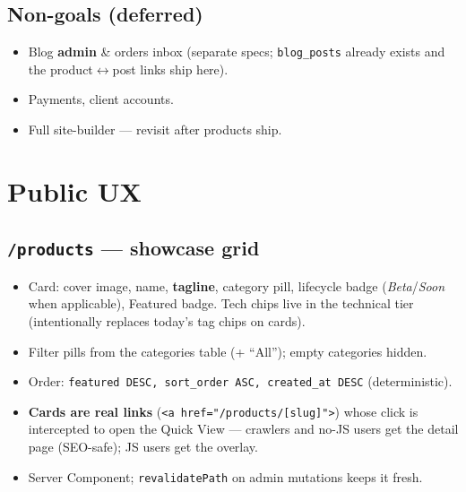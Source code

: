 \documentclass[11pt,a4paper]{article}
\begin{document}
\subsection{Non-goals (deferred)}
\begin{itemize}
  \item Blog \textbf{admin} \& orders inbox (separate specs; \texttt{blog\_posts} already
        exists and the product$\leftrightarrow$post links ship here).
  \item Payments, client accounts.
  \item Full site-builder --- revisit after products ship.
\end{itemize}

\section{Public UX}
\subsection{\texttt{/products} --- showcase grid}
\begin{itemize}
  \item Card: cover image, name, \textbf{tagline}, category pill, lifecycle badge
        (\emph{Beta}/\emph{Soon} when applicable), Featured badge. Tech chips live in the
        technical tier (intentionally replaces today's tag chips on cards).
  \item Filter pills from the categories table (+ ``All''); empty categories hidden.
  \item Order: \texttt{featured DESC, sort\_order ASC, created\_at DESC} (deterministic).
  \item \textbf{Cards are real links} (\texttt{<a href="/products/[slug]">}) whose click is
        intercepted to open the Quick View --- crawlers and no-JS users get the detail page
        (SEO-safe); JS users get the overlay.
  \item Server Component; \texttt{revalidatePath} on admin mutations keeps it fresh.
\end{itemize}
\end{document}
